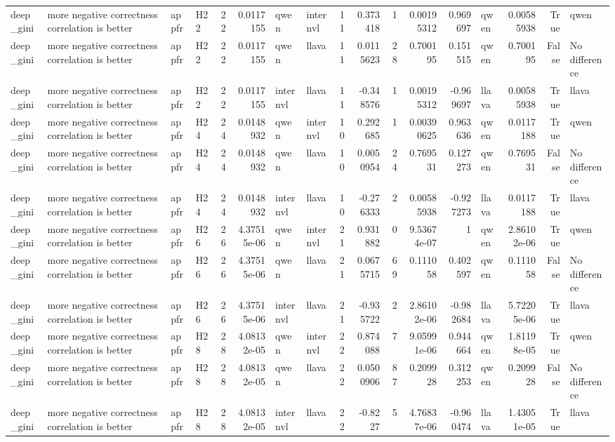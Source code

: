 \begin{longtable}{llllrrllrrrrrlrrl}
deep\_gini & more negative correctness correlation is better & appfr & H22 & 22 & 0.0117155 & qwen & internvl & 11 & 0.373418 & 1 & 0.00195312 & 0.969697 & qwen & 0.00585938 & True & qwen \\
deep\_gini & more negative correctness correlation is better & appfr & H22 & 22 & 0.0117155 & qwen & llava & 11 & 0.0115623 & 28 & 0.700195 & 0.151515 & qwen & 0.700195 & False & No difference \\
deep\_gini & more negative correctness correlation is better & appfr & H22 & 22 & 0.0117155 & internvl & llava & 11 & -0.348576 & 1 & 0.00195312 & -0.969697 & llava & 0.00585938 & True & llava \\
deep\_gini & more negative correctness correlation is better & appfr & H24 & 24 & 0.0148932 & qwen & internvl & 10 & 0.292685 & 1 & 0.00390625 & 0.963636 & qwen & 0.0117188 & True & qwen \\
deep\_gini & more negative correctness correlation is better & appfr & H24 & 24 & 0.0148932 & qwen & llava & 10 & 0.0050954 & 24 & 0.769531 & 0.127273 & qwen & 0.769531 & False & No difference \\
deep\_gini & more negative correctness correlation is better & appfr & H24 & 24 & 0.0148932 & internvl & llava & 10 & -0.276333 & 2 & 0.00585938 & -0.927273 & llava & 0.0117188 & True & llava \\
deep\_gini & more negative correctness correlation is better & appfr & H26 & 26 & 4.37515e-06 & qwen & internvl & 21 & 0.931882 & 0 & 9.53674e-07 & 1 & qwen & 2.86102e-06 & True & qwen \\
deep\_gini & more negative correctness correlation is better & appfr & H26 & 26 & 4.37515e-06 & qwen & llava & 21 & 0.0675715 & 69 & 0.111058 & 0.402597 & qwen & 0.111058 & False & No difference \\
deep\_gini & more negative correctness correlation is better & appfr & H26 & 26 & 4.37515e-06 & internvl & llava & 21 & -0.935722 & 2 & 2.86102e-06 & -0.982684 & llava & 5.72205e-06 & True & llava \\
deep\_gini & more negative correctness correlation is better & appfr & H28 & 28 & 4.08132e-05 & qwen & internvl & 22 & 0.874088 & 7 & 9.05991e-06 & 0.944664 & qwen & 1.81198e-05 & True & qwen \\
deep\_gini & more negative correctness correlation is better & appfr & H28 & 28 & 4.08132e-05 & qwen & llava & 22 & 0.0500906 & 87 & 0.209928 & 0.312253 & qwen & 0.209928 & False & No difference \\
deep\_gini & more negative correctness correlation is better & appfr & H28 & 28 & 4.08132e-05 & internvl & llava & 22 & -0.8227 & 5 & 4.76837e-06 & -0.960474 & llava & 1.43051e-05 & True & llava \\

\end{longtable}
